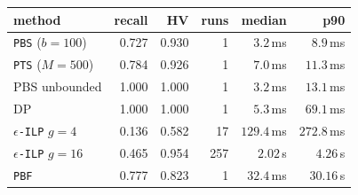 \setlength{\tabcolsep}{3.5pt}%
\begin{tabular}{lrrrrr}
\toprule
method & recall & HV & runs & median & p90 \\
\midrule
\texttt{PBS} ($b{=}100$) & 0.727 & 0.930 & 1 & $3.2$\,ms & $8.9$\,ms \\
\texttt{PTS} ($M{=}500$) & 0.784 & 0.926 & 1 & $7.0$\,ms & $11.3$\,ms \\
PBS unbounded & 1.000 & 1.000 & 1 & $3.2$\,ms & $13.1$\,ms \\
\midrule
DP & 1.000 & 1.000 & 1 & $5.3$\,ms & $69.1$\,ms \\
\texttt{$\epsilon$-ILP} $g{=}4$ & 0.136 & 0.582 & 17 & $129.4$\,ms & $272.8$\,ms \\
\texttt{$\epsilon$-ILP} $g{=}16$ & 0.465 & 0.954 & 257 & $2.02$\,s & $4.26$\,s \\
\texttt{PBF} & 0.777 & 0.823 & 1 & $32.4$\,ms & $30.16$\,s \\
\bottomrule
\end{tabular}
